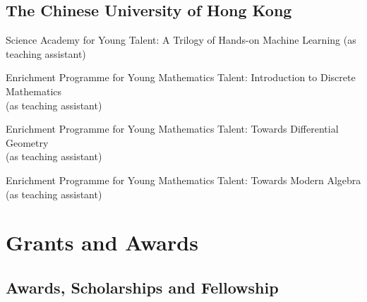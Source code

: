 \documentclass[11pt,letterpaper]{report}
\begin{document}
    \subsection*{The Chinese University of Hong Kong}

    \begin{tablist}

        \item[2022] \tab{} Science Academy for Young Talent: A Trilogy of Hands-on Machine Learning (as teaching assistant)
        \item[2021] \tab{} Enrichment Programme for Young Mathematics Talent: Introduction to Discrete Mathematics\\ (as teaching assistant)
        \item[2020] \tab{} Enrichment Programme for Young Mathematics Talent: Towards Differential Geometry\\ (as teaching assistant)
        \item[2019] \tab{} Enrichment Programme for Young Mathematics Talent: Towards Modern Algebra\\ (as teaching assistant)

    \end{tablist}

     \section*{Grants and Awards}

    \subsection*{Awards, Scholarships and Fellowship}
\end{document}
